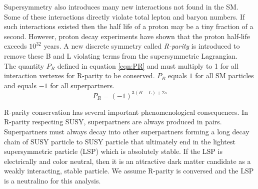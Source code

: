 \indent Supersymmetry also introduces many new interactions not found in the SM.  Some of these interactions directly violate total lepton and baryon numbers.  If such interactions existed then the half life of a proton may be a tiny fraction of a second.  However, proton decay experiments have shown that the proton half-life exceeds $10^{32}$ years.  A new discrete symmetry called {\it R-parity} is introduced to remove these B and L violating terms from the supersymmetric Lagrangian.  \\

\indent The quantity $P_R$ defined in equation \ref{eqn:PR} and must multiply to 1 for all interaction vertexes for R-parity to be conserved. $P_R$ equals $1$ for all SM particles and equals $-1$ for all superpartners.  \\

\begin{equation}
\label{eqn:PR}
P_R = (-1)^{3(B-L)+2s}
\end{equation}

\indent R-parity conservation has several important phenomenological consequences.  In R-parity respecting SUSY, superpartners are always produced in pairs.  Superpartners must always decay into other superpartners forming a long decay chain of SUSY particle to SUSY particle that ultimately end in the lightest supersymmetric particle (LSP) which is absolutely stable.  If the LSP is electrically and color neutral, then it is an attractive dark matter candidate as a weakly interacting, stable particle.  We assume R-parity is conversed and the LSP is a neutralino for this analysis.  \\
